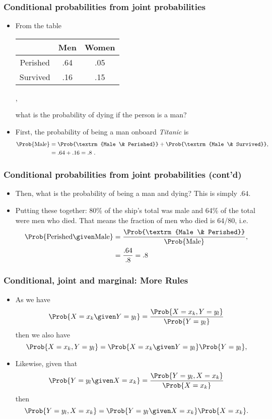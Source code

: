 \documentclass[10pt,xcolor=dvipsnames,serif,professionalfont]{beamer} %
\begin{document}
\begin{frame}
\frametitle{Conditional probabilities from joint probabilities}
\begin{itemize}
\item From the table
{\scriptsize
\begin{center}
\begin{tabular}{c|cc}
& Men & Women \\\hline
Perished & .64 & .05 \\
Survived & .16 & .15 \\
\end{tabular},
\end{center}
}
what is the probability of dying if the person is a man?
\item First, the probability of being a man onboard \emph{Titanic} is 
\begin{align}
\Prob{\textrm{Male}} &= \Prob{\textrm{Male \& Perished}} + \Prob{\textrm{Male \& Survived}},\\
&= .64 + .16 = .8\ .
\end{align}
\end{itemize}
\end{frame}

\begin{frame}
\frametitle{Conditional probabilities from joint probabilities (cont'd)}
\begin{itemize}
\item Then, what is the probability of being a man and dying? This is simply $.64$.
\item Putting these together: 80\% of the ship's total was male and 64\% of the total were men who died. That means the fraction of men who died is 64/80, i.e.
\begin{align}
\Prob{\textrm{Perished} \given \textrm{Male}} &= \frac{\Prob{\textrm{Male \& Perished}}}{\Prob{\textrm{Male}}},\\
&= \frac{.64}{.8} = .8 
\end{align}
\end{itemize}
\end{frame}


\begin{frame}
\frametitle{Conditional, joint and marginal: More Rules}
\begin{itemize}
\item As we have
\begin{equation}
\Prob{X=x_k \given Y=y_l } = \frac{\Prob{X=x_k, Y=y_l }}{ \Prob{Y=y_l } }
\end{equation}
then we also have 
\begin{equation}
\Prob{X=x_k,Y=y_l} = \Prob{X=x_k\given Y=y_l}\Prob{Y=y_l},
\end{equation}
\item Likewise, given that
\begin{equation}
\Prob{Y=y_l \given X=x_k} = \frac{\Prob{Y=y_l,X=x_k}}{\Prob{X=x_k}}
\end{equation}
then 
\begin{equation}
\Prob{Y=y_l,X=x_k} = \Prob{Y=y_l \given X=x_k}\Prob{X=x_k}.
\end{equation}
\end{itemize}
\end{frame}
\end{document}
